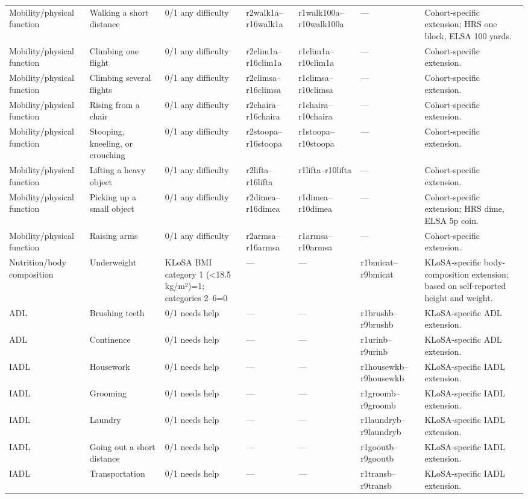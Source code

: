 \begin{landscape}
\begin{longtable}{@{}L{2.50cm}L{2.90cm}L{3.20cm}L{2.90cm}L{2.90cm}L{3.00cm}L{6.80cm}@{}}
Mobility/physical function & Walking a short distance & 0/1 any difficulty & r2walk1a--r16walk1a & r1walk100a--r10walk100a & --- & Cohort-specific extension; HRS one block, ELSA 100 yards. \\
Mobility/physical function & Climbing one flight & 0/1 any difficulty & r2clim1a--r16clim1a & r1clim1a--r10clim1a & --- & Cohort-specific extension. \\
Mobility/physical function & Climbing several flights & 0/1 any difficulty & r2climsa--r16climsa & r1climsa--r10climsa & --- & Cohort-specific extension. \\
Mobility/physical function & Rising from a chair & 0/1 any difficulty & r2chaira--r16chaira & r1chaira--r10chaira & --- & Cohort-specific extension. \\
Mobility/physical function & Stooping, kneeling, or crouching & 0/1 any difficulty & r2stoopa--r16stoopa & r1stoopa--r10stoopa & --- & Cohort-specific extension. \\
Mobility/physical function & Lifting a heavy object & 0/1 any difficulty & r2lifta--r16lifta & r1lifta--r10lifta & --- & Cohort-specific extension. \\
Mobility/physical function & Picking up a small object & 0/1 any difficulty & r2dimea--r16dimea & r1dimea--r10dimea & --- & Cohort-specific extension; HRS dime, ELSA 5p coin. \\
Mobility/physical function & Raising arms & 0/1 any difficulty & r2armsa--r16armsa & r1armsa--r10armsa & --- & Cohort-specific extension. \\

Nutrition/body composition & Underweight & KLoSA BMI category 1 (<18.5 kg/m²)=1; categories 2--6=0 & --- & --- & r1bmicat--r9bmicat & KLoSA-specific body-composition extension; based on self-reported height and weight. \\
ADL & Brushing teeth & 0/1 needs help & --- & --- & r1brushb--r9brushb & KLoSA-specific ADL extension. \\
ADL & Continence & 0/1 needs help & --- & --- & r1urinb--r9urinb & KLoSA-specific ADL extension. \\
IADL & Housework & 0/1 needs help & --- & --- & r1housewkb--r9housewkb & KLoSA-specific IADL extension. \\
IADL & Grooming & 0/1 needs help & --- & --- & r1groomb--r9groomb & KLoSA-specific IADL extension. \\
IADL & Laundry & 0/1 needs help & --- & --- & r1laundryb--r9laundryb & KLoSA-specific IADL extension. \\
IADL & Going out a short distance & 0/1 needs help & --- & --- & r1gooutb--r9gooutb & KLoSA-specific IADL extension. \\
IADL & Transportation & 0/1 needs help & --- & --- & r1transb--r9transb & KLoSA-specific IADL extension. \\
\end{longtable}


\end{landscape}
